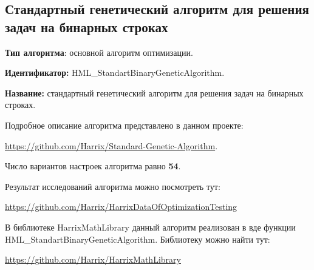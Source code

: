 \subsection{Стандартный генетический алгоритм для решения задач на бинарных строках}\label{HarrixOptimizationAlgorithms:HML_StandartBinaryGeneticAlgorithm}

\textbf{Тип алгоритма}: основной алгоритм оптимизации.

\textbf{Идентификатор:} HML\_StandartBinaryGeneticAlgorithm.

\textbf{Название:} стандартный генетический алгоритм для решения задач на бинарных строках.

Подробное описание алгоритма представлено в данном проекте: 

\href{https://github.com/Harrix/Standard-Genetic-Algorithm}{https://github.com/Harrix/Standard-Genetic-Algorithm}.

Число вариантов настроек алгоритма равно \textbf{54}.

Результат исследований алгоритма можно посмотреть тут:

\href{https://github.com/Harrix/HarrixDataOfOptimizationTesting}{https://github.com/Harrix/HarrixDataOfOptimizationTesting}

В библиотеке HarrixMathLibrary данный алгоритм реализован в вде функции HML\_StandartBinaryGeneticAlgorithm. Библиотеку можно найти тут:

\href{https://github.com/Harrix/HarrixMathLibrary}{https://github.com/Harrix/HarrixMathLibrary}